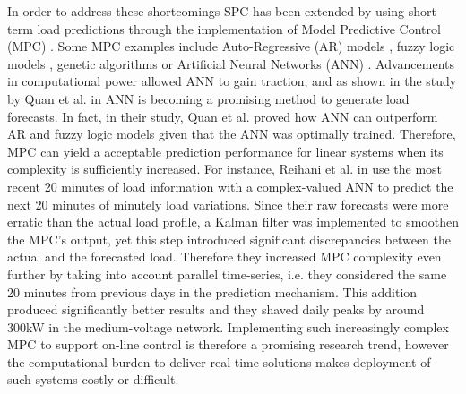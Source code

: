 In order to address these shortcomings SPC has been extended by using short-term load predictions through the implementation of Model Predictive Control (MPC) \cite{Gybel2012, Hatziargyriou2015}.
Some MPC examples include Auto-Regressive (AR) models \cite{Li2009, Nie2011}, fuzzy logic models \cite{Sannomiya2001, Chen2013a}, genetic algorithms \cite{Xia2015a, Liu2015} or Artificial Neural Networks (ANN) \cite{Kalogirou2014, Quan2014, Lee2014, Pezeshki2014, Vaz2016, Reihani2016, Xiao2017}.
Advancements in computational power allowed ANN to gain traction, and as shown in the study by Quan et al. in \cite{Quan2014} ANN is becoming a promising method to generate load forecasts.
In fact, in their study, Quan et al. proved how ANN can outperform AR and fuzzy logic models given that the ANN was optimally trained.
Therefore, MPC can yield a acceptable prediction performance for linear systems when its complexity is sufficiently increased.
For instance, Reihani et al. in \cite{Reihani2016} use the most recent 20 minutes of load information with a complex-valued ANN to predict the next 20 minutes of minutely load variations.
Since their raw forecasts were more erratic than the actual load profile, a Kalman filter was implemented to smoothen the MPC's output, yet this step introduced significant discrepancies between the actual and the forecasted load.
Therefore they increased MPC complexity even further by taking into account parallel time-series, i.e. they considered the same 20 minutes from previous days in the prediction mechanism.
This addition produced significantly better results and they shaved daily peaks by around 300kW in the medium-voltage network.
Implementing such increasingly complex MPC to support on-line control is therefore a promising research trend, however the computational burden to deliver real-time solutions makes deployment of such systems costly or difficult.

